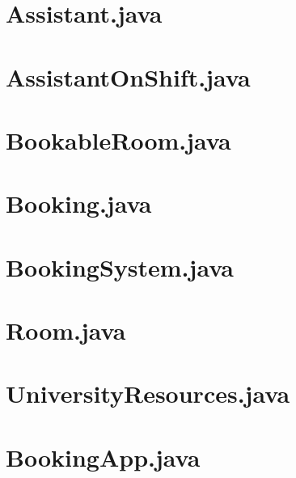 \documentclass{article}
\begin{document}
\section{Assistant.java}


\section{AssistantOnShift.java}


\section{BookableRoom.java}


\section{Booking.java}


\section{BookingSystem.java}


\section{Room.java}


\section{UniversityResources.java}


\section{BookingApp.java}

\end{document}
